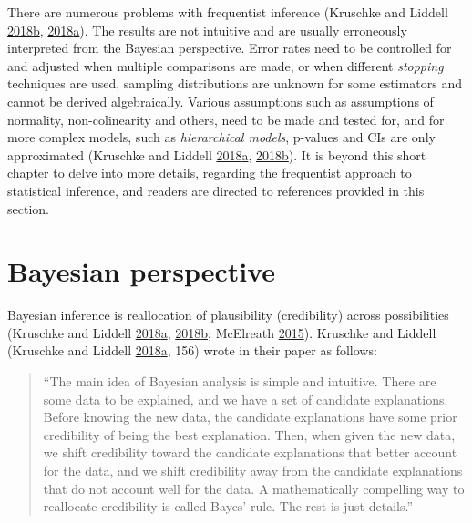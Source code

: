\documentclass[
]{book}
\begin{document}
There are numerous problems with frequentist inference (Kruschke and Liddell \protect\hyperlink{ref-kruschkeBayesianNewStatistics2018}{2018}\protect\hyperlink{ref-kruschkeBayesianNewStatistics2018}{b}, \protect\hyperlink{ref-kruschkeBayesianDataAnalysis2018}{2018}\protect\hyperlink{ref-kruschkeBayesianDataAnalysis2018}{a}). The results are not intuitive and are usually erroneously interpreted from the Bayesian perspective. Error rates need to be controlled for and adjusted when multiple comparisons are made, or when different \emph{stopping} techniques are used, sampling distributions are unknown for some estimators and cannot be derived algebraically. Various assumptions such as assumptions of normality, non-colinearity and others, need to be made and tested for, and for more complex models, such as \emph{hierarchical models}, p-values and CIs are only approximated (Kruschke and Liddell \protect\hyperlink{ref-kruschkeBayesianDataAnalysis2018}{2018}\protect\hyperlink{ref-kruschkeBayesianDataAnalysis2018}{a}, \protect\hyperlink{ref-kruschkeBayesianNewStatistics2018}{2018}\protect\hyperlink{ref-kruschkeBayesianNewStatistics2018}{b}). It is beyond this short chapter to delve into more details, regarding the frequentist approach to statistical inference, and readers are directed to references provided in this section.

\hypertarget{bayesian-perspective}{%
\chapter{Bayesian perspective}\label{bayesian-perspective}}

Bayesian inference is reallocation of plausibility (credibility) across possibilities (Kruschke and Liddell \protect\hyperlink{ref-kruschkeBayesianDataAnalysis2018}{2018}\protect\hyperlink{ref-kruschkeBayesianDataAnalysis2018}{a}, \protect\hyperlink{ref-kruschkeBayesianNewStatistics2018}{2018}\protect\hyperlink{ref-kruschkeBayesianNewStatistics2018}{b}; McElreath \protect\hyperlink{ref-mcelreathStatisticalRethinkingBayesian2015}{2015}). Kruschke and Liddell (Kruschke and Liddell \protect\hyperlink{ref-kruschkeBayesianDataAnalysis2018}{2018}\protect\hyperlink{ref-kruschkeBayesianDataAnalysis2018}{a}, 156) wrote in their paper as follows:

\begin{quote}
``The main idea of Bayesian analysis is simple and intuitive. There are some data to be explained, and we have a set of candidate explanations. Before knowing the new data, the candidate explanations have some prior credibility of being the best explanation. Then, when given the new data, we shift credibility toward the candidate explanations that better account for the data, and we shift credibility away from the candidate explanations that do not account well for the data. A mathematically compelling way to reallocate credibility is called Bayes' rule. The rest is just details.''
\end{quote}
\end{document}
